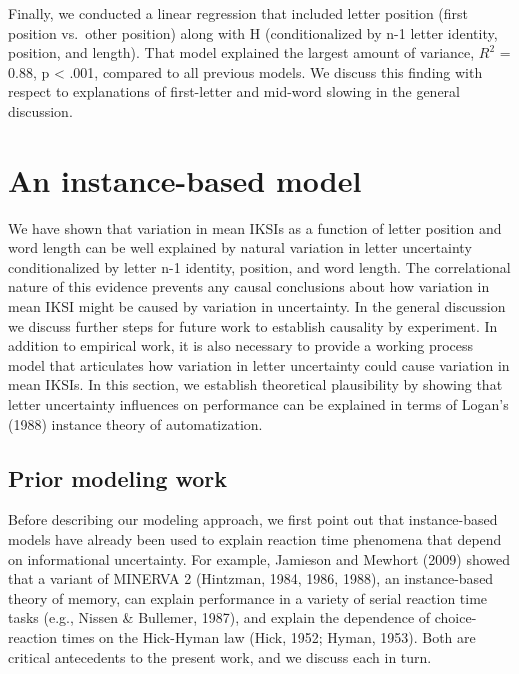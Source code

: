 \documentclass[,man,floatsintext]{apa6}
\begin{document}
Finally, we conducted a linear regression that included letter position (first position vs.~other position) along with H (conditionalized by n-1 letter identity, position, and length). That model explained the largest amount of variance, \(R^2\) = 0.88, p \textless{} .001, compared to all previous models. We discuss this finding with respect to explanations of first-letter and mid-word slowing in the general discussion.

\hypertarget{an-instance-based-model}{%
\section{An instance-based model}\label{an-instance-based-model}}

We have shown that variation in mean IKSIs as a function of letter position and word length can be well explained by natural variation in letter uncertainty conditionalized by letter n-1 identity, position, and word length. The correlational nature of this evidence prevents any causal conclusions about how variation in mean IKSI might be caused by variation in uncertainty. In the general discussion we discuss further steps for future work to establish causality by experiment. In addition to empirical work, it is also necessary to provide a working process model that articulates how variation in letter uncertainty could cause variation in mean IKSIs. In this section, we establish theoretical plausibility by showing that letter uncertainty influences on performance can be explained in terms of Logan's (1988) instance theory of automatization.

\hypertarget{prior-modeling-work}{%
\subsection{Prior modeling work}\label{prior-modeling-work}}

Before describing our modeling approach, we first point out that instance-based models have already been used to explain reaction time phenomena that depend on informational uncertainty. For example, Jamieson and Mewhort (2009) showed that a variant of MINERVA 2 (Hintzman, 1984, 1986, 1988), an instance-based theory of memory, can explain performance in a variety of serial reaction time tasks (e.g., Nissen \& Bullemer, 1987), and explain the dependence of choice-reaction times on the Hick-Hyman law (Hick, 1952; Hyman, 1953). Both are critical antecedents to the present work, and we discuss each in turn.
\end{document}
